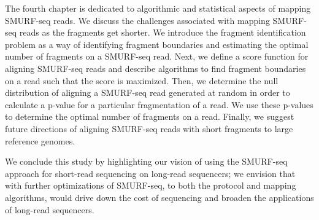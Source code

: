The fourth chapter is dedicated to algorithmic and statistical aspects
of mapping SMURF-seq reads. We discuss the challenges associated with
mapping SMURF-seq reads as the fragments get shorter.
%
We introduce the fragment identification problem as a way of identifying
fragment boundaries and estimating the optimal number of fragments on a
SMURF-seq read.
%
Next, we define a score function for aligning SMURF-seq reads and
describe algorithms to find fragment boundaries on a read such that the
score is maximized.
%
Then, we determine the null distribution of aligning a SMURF-seq read
generated at random in order to calculate a p-value for a particular
fragmentation of a read. We use these p-values to determine the optimal
number of fragments on a read.
%
Finally, we suggest future directions of aligning SMURF-seq reads with
short fragments to large reference genomes.

We conclude this study by highlighting our vision of using the SMURF-seq
approach for short-read sequencing on long-read sequencers; we envision
that with further optimizations of SMURF-seq, to both the protocol and
mapping algorithms, would drive down the cost of sequencing and broaden
the applications of long-read sequencers.

